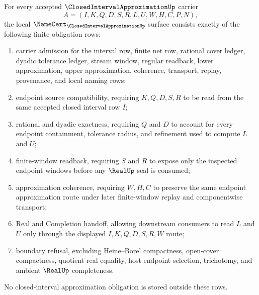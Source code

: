 \begin{theorem}
\label{thm:closed-interval-approximation-namecert-obligations}
For every accepted $\ClosedIntervalApproximationUp$ carrier
$$
A=(I,K,Q,D,S,R,L,U,W,H,C,P,N),
$$
the local $\NameCert_{\ClosedIntervalApproximationUp}$ surface consists exactly of the following finite obligation rows:
\begin{enumerate}
\item carrier admission for the interval row, finite net row, rational cover ledger, dyadic tolerance ledger, stream window, regular readback, lower approximation, upper approximation, coherence, transport, replay, provenance, and local naming rows;
\item endpoint source compatibility, requiring $K,Q,D,S,R$ to be read from the same accepted closed interval row $I$;
\item rational and dyadic exactness, requiring $Q$ and $D$ to account for every endpoint containment, tolerance radius, and refinement used to compute $L$ and $U$;
\item finite-window readback, requiring $S$ and $R$ to expose only the inspected endpoint windows before any $\RealUp$ seal is consumed;
\item approximation coherence, requiring $W,H,C$ to preserve the same endpoint approximation route under later finite-window replay and componentwise transport;
\item Real and Completion handoff, allowing downstream consumers to read $L$ and $U$ only through the displayed $I,K,Q,D,S,R,W$ route;
\item boundary refusal, excluding Heine--Borel compactness, open-cover compactness, quotient real equality, host endpoint selection, trichotomy, and ambient $\RealUp$ completeness.
\end{enumerate}
No closed-interval approximation obligation is stored outside these rows.
\end{theorem}
